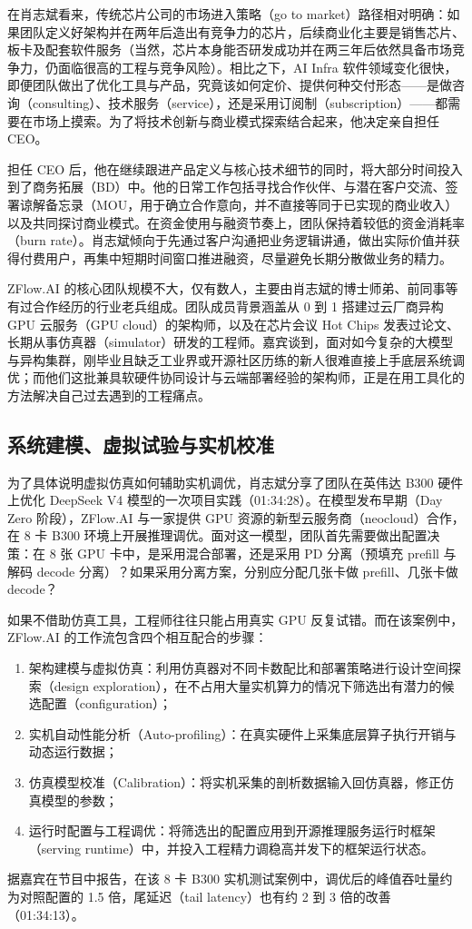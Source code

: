 \documentclass[UTF8,a4paper,11pt,fontset=fandol]{ctexart}
\begin{document}
在肖志斌看来，传统芯片公司的市场进入策略（go to market）路径相对明确：如果团队定义好架构并在两年后造出有竞争力的芯片，后续商业化主要是销售芯片、板卡及配套软件服务（当然，芯片本身能否研发成功并在两三年后依然具备市场竞争力，仍面临很高的工程与竞争风险）。相比之下，AI Infra 软件领域变化很快，即便团队做出了优化工具与产品，究竟该如何定价、提供何种交付形态——是做咨询（consulting）、技术服务（service），还是采用订阅制（subscription）——都需要在市场上摸索。为了将技术创新与商业模式探索结合起来，他决定亲自担任 CEO。

担任 CEO 后，他在继续跟进产品定义与核心技术细节的同时，将大部分时间投入到了商务拓展（BD）中。他的日常工作包括寻找合作伙伴、与潜在客户交流、签署谅解备忘录（MOU，用于确立合作意向，并不直接等同于已实现的商业收入）以及共同探讨商业模式。在资金使用与融资节奏上，团队保持着较低的资金消耗率（burn rate）。肖志斌倾向于先通过客户沟通把业务逻辑讲通，做出实际价值并获得付费用户，再集中短期时间窗口推进融资，尽量避免长期分散做业务的精力。

ZFlow.AI 的核心团队规模不大，仅有数人，主要由肖志斌的博士师弟、前同事等有过合作经历的行业老兵组成。团队成员背景涵盖从 0 到 1 搭建过云厂商异构 GPU 云服务（GPU cloud）的架构师，以及在芯片会议 Hot Chips 发表过论文、长期从事仿真器（simulator）研发的工程师。嘉宾谈到，面对如今复杂的大模型与异构集群，刚毕业且缺乏工业界或开源社区历练的新人很难直接上手底层系统调优；而他们这批兼具软硬件协同设计与云端部署经验的架构师，正是在用工具化的方法解决自己过去遇到的工程痛点。

\subsection{系统建模、虚拟试验与实机校准}
为了具体说明虚拟仿真如何辅助实机调优，肖志斌分享了团队在英伟达 B300 硬件上优化 DeepSeek V4 模型的一次项目实践（01:34:28）。在模型发布早期（Day Zero 阶段），ZFlow.AI 与一家提供 GPU 资源的新型云服务商（neocloud）合作，在 8 卡 B300 环境上开展推理调优。面对这一模型，团队首先需要做出配置决策：在 8 张 GPU 卡中，是采用混合部署，还是采用 PD 分离（预填充 prefill 与解码 decode 分离）？如果采用分离方案，分别应分配几张卡做 prefill、几张卡做 decode？

如果不借助仿真工具，工程师往往只能占用真实 GPU 反复试错。而在该案例中，ZFlow.AI 的工作流包含四个相互配合的步骤：
\begin{enumerate}
\item 架构建模与虚拟仿真：利用仿真器对不同卡数配比和部署策略进行设计空间探索（design exploration），在不占用大量实机算力的情况下筛选出有潜力的候选配置（configuration）；
\item 实机自动性能分析（Auto-profiling）：在真实硬件上采集底层算子执行开销与动态运行数据；
\item 仿真模型校准（Calibration）：将实机采集的剖析数据输入回仿真器，修正仿真模型的参数；
\item 运行时配置与工程调优：将筛选出的配置应用到开源推理服务运行时框架（serving runtime）中，并投入工程精力调稳高并发下的框架运行状态。
\end{enumerate}
据嘉宾在节目中报告，在该 8 卡 B300 实机测试案例中，调优后的峰值吞吐量约为对照配置的 1.5 倍，尾延迟（tail latency）也有约 2 到 3 倍的改善（01:34:13）。
\end{document}
